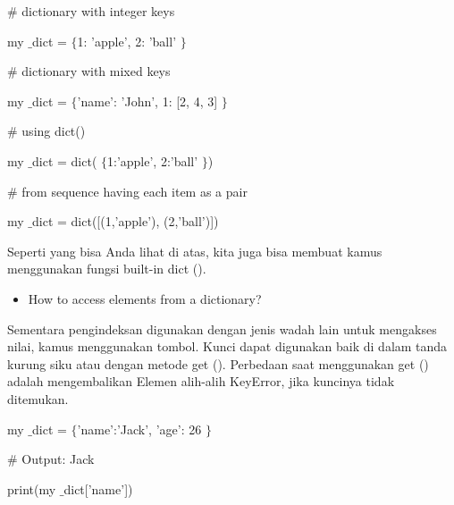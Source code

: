  \hspace*{0.5in}  $  \#  $ dictionary with integer keys \par
\noindent 
 \hspace*{0.5in} my $  \_  $dict =  $  \{  $1: 'apple', 2: 'ball' $  \}  $ \par
\vspace{12pt}
\noindent 
 \hspace*{0.5in}  $  \#  $ dictionary with mixed keys \par
\noindent 
 \hspace*{0.5in} my $  \_  $dict =  $  \{  $'name': 'John', 1: [2, 4, 3] $  \}  $ \par
\vspace{12pt}
\noindent 
 \hspace*{0.5in}  $  \#  $ using dict() \par
\noindent 
 \hspace*{0.5in} my $  \_  $dict = dict( $  \{  $1:'apple', 2:'ball' $  \}  $) \par
\vspace{12pt}
\noindent 
 \hspace*{0.5in}  $  \#  $ from sequence having each item as a pair \par
\noindent 
 \hspace*{0.5in} my $  \_  $dict = dict([(1,'apple'), (2,'ball')]) \par
\noindent 
Seperti yang bisa Anda lihat di atas, kita juga bisa membuat kamus menggunakan fungsi built-in dict (). \par
\noindent 
\begin{itemize}
	\item How to access elements from a dictionary?
\end{itemize}
\noindent 
Sementara pengindeksan digunakan dengan jenis wadah lain untuk mengakses nilai, kamus menggunakan tombol. Kunci dapat digunakan baik di dalam tanda kurung siku atau dengan metode get (). Perbedaan saat menggunakan get () adalah mengembalikan Elemen alih-alih KeyError, jika kuncinya tidak ditemukan. \par
\noindent 
 \hspace*{0.5in} my $  \_  $dict =  $  \{  $'name':'Jack', 'age': 26 $  \}  $ \par
\noindent 
 \hspace*{0.5in}  $  \#  $ Output: Jack \par
\noindent 
 \hspace*{0.5in} print(my $  \_  $dict['name']) \par
